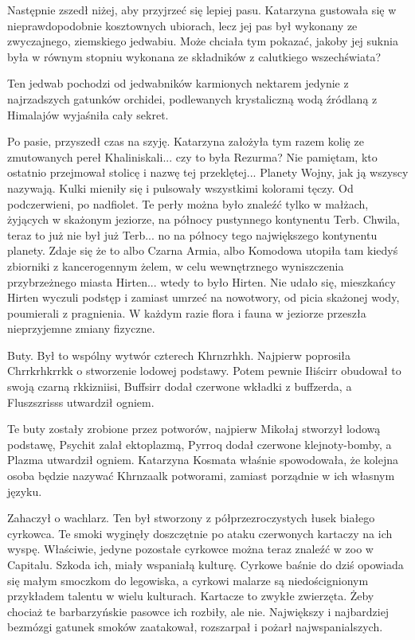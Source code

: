 Następnie zszedł niżej, aby przyjrzeć się lepiej pasu.
Katarzyna gustowała się w nieprawdopodobnie kosztownych ubiorach, lecz jej pas był wykonany ze zwyczajnego, ziemskiego jedwabiu.
Może chciała tym pokazać, jakoby jej suknia była w równym stopniu wykonana ze składników z calutkiego wszechświata?
\begin{dialogue}
\ds{} Ten jedwab pochodzi od jedwabników karmionych nektarem jedynie z najrzadszych gatunków orchidei, podlewanych krystaliczną wodą źródlaną z Himalajów
\dm{} wyjaśniła cały sekret.
\end{dialogue}

Po pasie, przyszedł czas na szyję. Katarzyna założyła tym razem kolię ze zmutowanych pereł Khaliniskali...
czy to była Rezurma? Nie pamiętam, kto ostatnio przejmował stolicę i nazwę tej przeklętej... Planety Wojny, jak ją wszyscy nazywają.
Kulki mieniły się i pulsowały wszystkimi kolorami tęczy. Od podczerwieni, po nadfiolet.
Te perły można było znaleźć tylko w małżach, żyjących w skażonym jeziorze, na północy pustynnego kontynentu Terb. Chwila, teraz to już nie był już Terb... no na północy tego największego kontynentu planety.
Zdaje się że to albo Czarna Armia, albo Komodowa utopiła tam kiedyś zbiorniki z kancerogennym żelem, w celu wewnętrznego wyniszczenia przybrzeżnego miasta Hirten... wtedy to było Hirten.
Nie udało się, mieszkańcy Hirten wyczuli podstęp i zamiast umrzeć na nowotwory, od picia skażonej wody, poumierali z pragnienia.
W każdym razie flora i fauna w jeziorze przeszła nieprzyjemne zmiany fizyczne.

Buty. Był to wspólny wytwór czterech Khrnzrhkh.
Najpierw poprosiła Chrrkrhkrrkk o stworzenie lodowej podstawy.
Potem pewnie Iłiścirr obudował to swoją czarną rkkizniisi, Buffsirr dodał czerwone wkładki z buffzerda, a Fluszszrisss utwardził ogniem.
\begin{dialogue}
\ds{} Te buty zostały zrobione przez potworów, najpierw Mikołaj stworzył lodową podstawę, Psychit zalał ektoplazmą, Pyrroq dodał czerwone klejnoty-bomby, a Plazma utwardził ogniem. \dm{}
Katarzyna Kosmata właśnie spowodowała, że kolejna osoba będzie nazywać Khrnzaalk potworami, zamiast porządnie w ich własnym języku.
\end{dialogue}

Zahaczył o wachlarz.
Ten był stworzony z półprzezroczystych łusek białego cyrkowca.
Te smoki wyginęły doszczętnie po ataku czerwonych kartaczy na ich wyspę.
Właściwie, jedyne pozostałe cyrkowce można teraz znaleźć w zoo w Capitalu.
Szkoda ich, miały wspaniałą kulturę.
Cyrkowe baśnie do dziś opowiada się małym smoczkom do legowiska, a cyrkowi malarze są niedoścignionym przykładem talentu w wielu kulturach.
Kartacze to zwykłe zwierzęta. Żeby chociaż te barbarzyńskie pasowce ich rozbiły, ale nie. Największy i najbardziej bezmózgi gatunek smoków zaatakował, rozszarpał i pożarł najwspanialszych.

